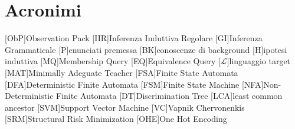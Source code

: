 %
%
\chapter*{Acronimi}
\begin{acronym}[WYSIWYM]
[ObP]{Observation Pack}
[IIR]{Inferenza Induttiva Regolare}
[GI]{Inferenza Grammaticale}
[P]{enunciati premessa}
[BK]{conoscenze di background}
[H]{ipotesi induttiva}
[MQ]{Membership Query}
[EQ]{Equivalence Query}
[$\mathcal{L}$]{linguaggio target}
[MAT]{Minimally Adeguate Teacher}
[FSA]{Finite State Automata}
[DFA]{Deterministic Finite Automata}
[FSM]{Finite State Machine}
[NFA]{Non-Deterministic Finite Automata}
[DT]{Discrimination Tree}
[LCA]{least common ancestor}
[SVM]{Support Vector Machine}
[VC]{Vapnik Chervonenkis}
[SRM]{Structural Risk Minimization}
[OHE]{One Hot Encoding}
\end{acronym}